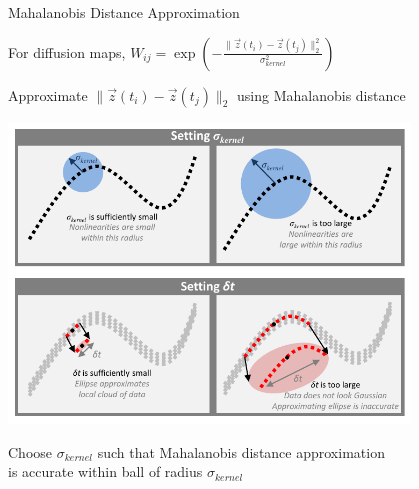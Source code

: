 \documentclass[12pt]{beamer}
\begin{document}
\begin{frame}{Mahalanobis Distance Approximation}

\centering


For diffusion maps,
$W_{ij} = \exp \left( -\frac{\| \vec{z}(t_i) - \vec{z}(t_j) \|_2^2}{\sigma_{kernel}^2} \right) $

Approximate $\| \vec{z}(t_i) - \vec{z}(t_j) \|_2$ using Mahalanobis distance

\vspace{0.5cm}

\includegraphics[width=0.8\textwidth, trim=0cm 5cm 0cm 0cm, clip]{schematic}

Choose $\sigma_{kernel}$ such that Mahalanobis distance approximation \\ is accurate
within ball of radius $\sigma_{kernel}$

\end{frame}
\end{document}
